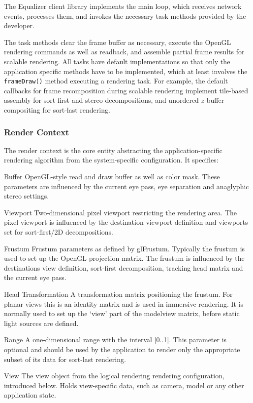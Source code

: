 The Equalizer client library implements the main loop, which receives network
events, processes them, and invokes the necessary task methods provided by the
developer.

The task methods clear the frame buffer as necessary, execute the OpenGL
rendering commands as well as readback, and assemble partial frame results for
scalable rendering. All tasks have default implementations so that only the
application specific methods have to be implemented, which at least involves
the {\tt frameDraw()} method executing a rendering task. For example, the
default callbacks for frame recomposition during scalable rendering implement
tile-based assembly for sort-first and stereo decompositions, and unordered
$z$-buffer compositing for sort-last rendering.

\subsubsection{Render Context}

The render context is the core entity abstracting the application-specific
rendering algorithm from the system-specific configuration. It specifies:

\begin{compactdesc}

 \item[Buffer] OpenGL-style read and draw buffer as well as color mask. These
 parameters are influenced by the current eye pass, eye separation and
 anaglyphic stereo settings.

 \item[Viewport] Two-dimensional pixel viewport restricting the rendering area.
 The pixel viewport is influenced by the destination viewport definition and
 viewports set for sort-first/2D decompositions.

 \item[Frustum] Frustum parameters as defined by \textsf{glFrustum}. Typically
 the frustum is used to set up the OpenGL projection matrix. The frustum is
 influenced by the destinations view definition, sort-first decomposition,
 tracking head matrix and the current eye pass.

 \item[Head Transformation] A transformation matrix positioning the frustum. For
 planar views this is an identity matrix and is used in immersive rendering.
 It is normally used to set up the `view' part of the modelview matrix, before
 static light sources are defined.
 \item[Range] A one-dimensional range with the interval [0..1]. This parameter is
 optional and should be used by the application to render only the appropriate
 subset of its data for sort-last rendering.

\item[View] The view object from the logical rendering rendering configuration,
introduced below. Holds view-specific data, such as camera, model or any other
application state.

\end{compactdesc}

